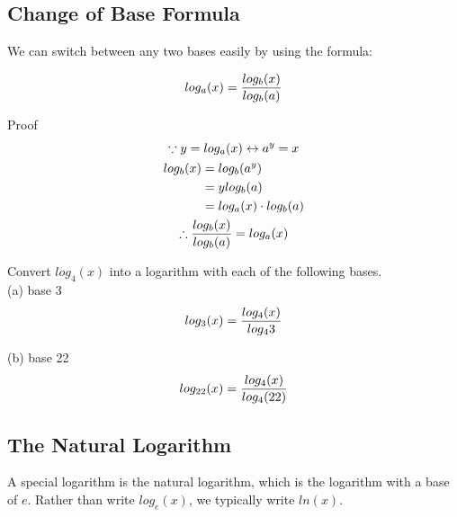 \subsection{Change of Base Formula}

We can switch between any two bases easily by using the formula: \\

\begin{theorem}
	\begin{align}
		log_a(x) = {log_b(x) \over log_b(a)}
	\end{align}
\end{theorem}

\begin{exercise}\nonumber
	Proof \\
	\begin{gather*}
		\because y = log_a(x) \leftrightarrow a^y = x \\
		\begin{align}
			log_b(x) & = log_b(a^y)              \\
			         & = ylog_b(a)               \\
			         & = log_a(x) \cdot log_b(a)
		\end{align}
		\\
		\therefore {log_b(x) \over log_b(a)} = log_a(x)
	\end{gather*}
\end{exercise}

\begin{exercise}\nonumber
	Convert $ log_4(x) $ into a logarithm with each of the following bases. \\

	(a) base 3 \\

	$$
	log_3(x) = {log_4(x) \over log_4{3}}
	$$

	(b) base 22 \\

	$$
	log_{22}(x) = {log_4(x) \over log_4(22)}
	$$
\end{exercise}

\subsection{The Natural Logarithm}

A special logarithm is the natural logarithm, which is the logarithm with a base of $ e $. Rather than write $ log_e(x) $, we typically write $ ln(x) $. \\

